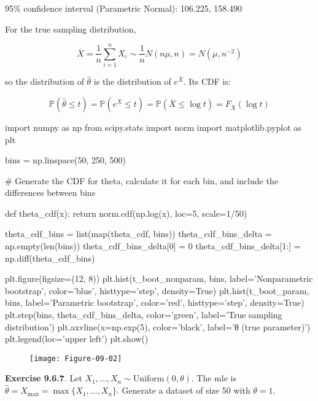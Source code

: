 \begin{console}
95\% confidence interval (Parametric Normal):     106.225, 158.490
\end{console}

For the true sampling distribution,

\[ \overline{X} 
= \frac{1}{n} \sum_{i=1}^{n} X_{i} \sim \frac{1}{n} N(n \mu, n) 
= N(\mu, n^{-2})
\]

so the distribution of \(\hat{\theta}\) is the distribution of
\(e^{\overline{X}}\). Its CDF is:

\[
\mathbb{P}\left(\hat{\theta} \leq t\right) 
= \mathbb{P}\left(e^{\overline{X}} \leq t\right) 
= \mathbb{P}\left(\overline{X} \leq \log t\right) 
= F_{\overline{X}}\left(\log t\right)
\]

\begin{python}
import numpy as np
from scipy.stats import norm
import matplotlib.pyplot as plt

bins = np.linspace(50, 250, 500)
\end{python}

\begin{python}
# Generate the CDF for theta, calculate it for each bin, and include the differences between bins

def theta_cdf(x):
    return norm.cdf(np.log(x), loc=5, scale=1/50)

theta_cdf_bins = list(map(theta_cdf, bins))
theta_cdf_bins_delta = np.empty(len(bins))
theta_cdf_bins_delta[0] = 0
theta_cdf_bins_delta[1:] = np.diff(theta_cdf_bins)
\end{python}

\begin{python}
plt.figure(figsize=(12, 8))
plt.hist(t_boot_{n}onparam, bins, label='Nonparametric bootstrap', color='blue', 
         histtype='step', density=True)
plt.hist(t_boot_param, bins, label='Parametric bootstrap', color='red', 
         histtype='step', density=True)
plt.step(bins, theta_cdf_bins_delta, color='green', label='True sampling distribution')
plt.axvline(x=np.exp(5), color='black', label='θ (true parameter)')
plt.legend(loc='upper left')
plt.show()
\end{python}

\begin{figure}[H]
\centering
\texttt{[image: Figure-09-02]}
\end{figure}

\textbf{Exercise 9.6.7}. Let
\(X_{1}, \dots, X_{n} \sim \text{Uniform}(0, \theta)\). The mle is
\(\hat{\theta} = X_\text{max} = \max \{ X_{1}, \dots, X_{n} \}\). Generate a
dataset of size 50 with \(\theta = 1\).

